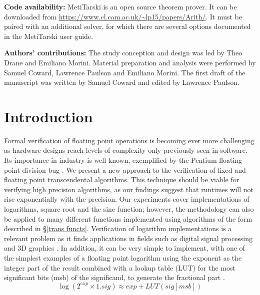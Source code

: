 \documentclass{fac}
\begin{document}
\noindent\textbf{Code availability:} MetiTarski is an open source theorem prover. It can be downloaded from
\newline \url{https://www.cl.cam.ac.uk/~lp15/papers/Arith/}. It must be paired with an additional solver, for which there are several options documented in the MetiTarski user guide.

\noindent\textbf{Authors' contributions:} The study conception and design was led by Theo Drane and Emiliano Morini. Material preparation and analysis were performed by Samuel Coward, Lawrence Paulson and Emiliano Morini. The first draft of the manuscript was written by Samuel Coward and edited by Lawrence Paulson.

\section{Introduction}
\label{intro}
Formal verification of floating point operations is becoming ever more challenging as hardware designs reach levels of complexity only previously seen in software. Its importance in industry is well known, exemplified by the Pentium floating point division bug \cite{pratt1995anatomy}. We present a new approach to the verification of fixed and floating point transcendental algorithms. This technique should be viable for verifying high precision algorithms, as our findings suggest that runtimes will not rise exponentially with the precision.  Our experiments cover implementations of logarithms, square root and the sine function; however, the methodology can also be applied to many different functions implemented using algorithms of the form described in \S \ref{trans functs}. Verification of logarithm implementations is a relevant problem as it finds applications in fields such as digital signal processing and 3D graphics \cite{lewis1995114,harris2001powering}. In addition, it can be very simple to implement, with one of the simplest examples of a floating point logarithm using the exponent as the integer part of the result combined with a lookup table (LUT) for the most significant bits (msb) of the significand, to generate the fractional part \cite{harris2001powering}.
\begin{equation*}
    \log(2^{\textit{exp}} \times 1.sig) \approx \textit{exp} + LUT(\textit{sig}[msb])
\end{equation*}
\end{document}
